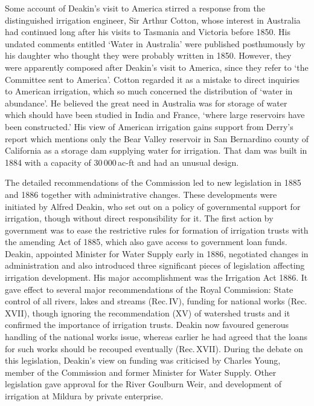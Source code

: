Some account of Deakin's visit to America stirred a response from the
distinguished irrigation engineer, Sir Arthur Cotton, whose interest
in Australia had continued long after his visits to Tasmania and
Victoria before 1850.  His undated comments entitled `Water in
Australia' were published posthumously by his daughter who thought
they were probably written in 1850.  However, they were apparently composed after Deakin's visit
to America, since they refer to `the Committee sent to America'.
Cotton regarded it as a mistake to direct inquiries to American
irrigation, which so much concerned the distribution of `water in
abundance'.  He believed the great need in Australia was for storage
of water which should have been studied in India and France, `where
large reservoirs have been constructed.'  His view of American
irrigation gains support from Derry's report which mentions only the
Bear Valley reservoir in San Bernardino county of California as a
storage dam supplying water for irrigation.  That dam was built in 1884 with a capacity of 30\,000\,ac-ft
and had an unusual design.

The detailed recommendations of the Commission led to new legislation
in 1885 and 1886 together with administrative changes.  These
developments were initiated by Alfred Deakin, who set out on a policy
of governmental support for irrigation, though without direct
responsibility for it.  The first action by government was to ease the
restrictive rules for formation of irrigation trusts with the amending
Act of 1885, which also gave access to government loan funds.  Deakin,
appointed Minister for Water Supply early in 1886, negotiated changes
in administration and also introduced three significant pieces of
legislation affecting irrigation development.  His major
accomplishment was the Irrigation Act 1886.  It gave effect to several major
recommendations of the Royal Commission: State control of all rivers,
lakes and streams (Rec.\,IV), funding for national works (Rec.\,XVII),
though ignoring the recommendation (XV) of watershed trusts and it
confirmed the importance of irrigation trusts.  Deakin now favoured
generous handling of the national works issue, whereas earlier he had
agreed that the loans for such works should be recouped eventually
(Rec.\,XVII).  During the debate on this legislation, Deakin's view on
funding was criticised by Charles Young, member of the Commission and
former Minister for Water Supply.
Other legislation gave approval for the River Goulburn Weir, and
development of irrigation at Mildura by private enterprise.

